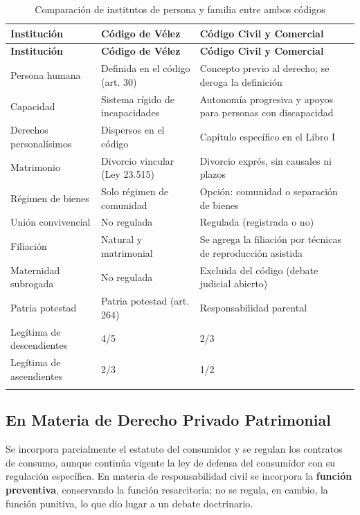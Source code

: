 \documentclass[12pt,oneside]{book}
\begin{document}
\begin{longtable}{@{}p{}p{}p{}@{}}
\toprule
\textbf{Institución} & \textbf{Código de Vélez} & \textbf{Código Civil y Comercial} \\
\midrule
\endfirsthead
\toprule
\textbf{Institución} & \textbf{Código de Vélez} & \textbf{Código Civil y Comercial} \\
\midrule
\endhead
Persona humana & Definida en el código (art. 30) & Concepto previo al derecho; se deroga la definición \\
Capacidad & Sistema rígido de incapacidades & Autonomía progresiva y apoyos para personas con discapacidad \\
Derechos personalísimos & Dispersos en el código & Capítulo específico en el Libro I \\
Matrimonio & Divorcio vincular (Ley 23.515) & Divorcio exprés, sin causales ni plazos \\
Régimen de bienes & Solo régimen de comunidad & Opción: comunidad o separación de bienes \\
Unión convivencial & No regulada & Regulada (registrada o no) \\
Filiación & Natural y matrimonial & Se agrega la filiación por técnicas de reproducción asistida \\
Maternidad subrogada & No regulada & Excluida del código (debate judicial abierto) \\
Patria potestad & Patria potestad (art. 264) & Responsabilidad parental \\
Legítima de descendientes & 4/5 & 2/3 \\
Legítima de ascendientes & 2/3 & 1/2 \\
\bottomrule
\caption{Comparación de institutos de persona y familia entre ambos códigos}
\end{longtable}

\subsection{En Materia de Derecho Privado Patrimonial}

Se incorpora parcialmente el estatuto del consumidor y se regulan los contratos de consumo, aunque continúa vigente la ley de defensa del consumidor con su regulación específica. En materia de responsabilidad civil se incorpora la \textbf{función preventiva}, conservando la función resarcitoria; no se regula, en cambio, la función punitiva, lo que dio lugar a un debate doctrinario.
\end{document}
